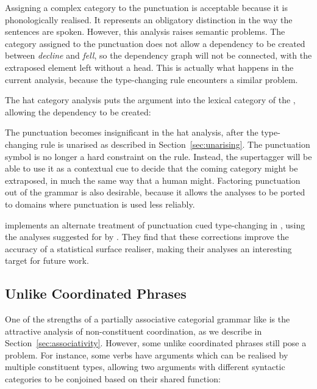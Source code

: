 Assigning a complex category to the punctuation is acceptable because it is
phonologically realised. It represents an obligatory distinction in the way the
sentences are spoken. However, this analysis raises semantic problems. The
 category assigned to the punctuation does not allow a
dependency to be created between \emph{decline} and \emph{fell}, so the
dependency graph will not be connected, with the extraposed element left without
a head. This is actually what happens in the current \ccgbank analysis, because
the type-changing rule encounters a similar problem.

The hat category analysis puts the  argument into the lexical category of
the , allowing the dependency to be created:

\begin{center}
\end{center}

The punctuation becomes insignificant in the hat analysis, after the
type-changing rule is unarised as described in Section~\ref{sec:unarising}. The
punctuation symbol is no longer a hard constraint on the rule. Instead, the
supertagger will be able to use it as a contextual cue to decide that the coming
category might be extraposed, in much the same way that a human might. Factoring
punctuation out of the grammar is also desirable, because it allows the analyses
to be ported to domains where punctuation is used less reliably.

\citet{white:punct08} implements an alternate treatment of punctuation cued
type-changing in \ccgbank, using the analyses suggested for \ltag by
\citet{doran:98}. They find that these corrections improve the accuracy
of a statistical \ccg surface realiser, making their analyses
an interesting target for future work.

\subsection{Unlike Coordinated Phrases}

One of the strengths of a partially associative categorial grammar like \ccg is
the attractive analysis of non-constituent coordination, as we describe in
Section~\ref{sec:associativity}. However, some unlike coordinated phrases still
pose a problem. For instance, some verbs have arguments which can be realised by
multiple constituent types, allowing two arguments with different syntactic
categories to be conjoined based on their shared function:

